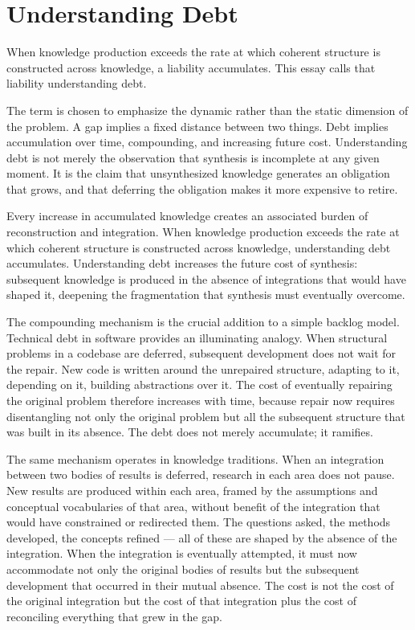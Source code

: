 \section{Understanding Debt}

When knowledge production exceeds the rate at which coherent structure is
constructed across knowledge, a liability accumulates. This essay calls that
liability understanding debt.

The term is chosen to emphasize the dynamic rather than the static dimension
of the problem. A gap implies a fixed distance between two things. Debt implies
accumulation over time, compounding, and increasing future cost. Understanding
debt is not merely the observation that synthesis is incomplete at any given
moment. It is the claim that unsynthesized knowledge generates an obligation
that grows, and that deferring the obligation makes it more expensive to retire.

\begin{principle}
Every increase in accumulated knowledge creates an associated burden of
reconstruction and integration. When knowledge production exceeds the rate
at which coherent structure is constructed across knowledge, understanding
debt accumulates. Understanding debt increases the future cost of synthesis:
subsequent knowledge is produced in the absence of integrations that would
have shaped it, deepening the fragmentation that synthesis must eventually
overcome.
\end{principle}

The compounding mechanism is the crucial addition to a simple backlog model.
Technical debt in software provides an illuminating analogy. When structural
problems in a codebase are deferred, subsequent development does not wait for
the repair. New code is written around the unrepaired structure, adapting to
it, depending on it, building abstractions over it. The cost of eventually
repairing the original problem therefore increases with time, because repair
now requires disentangling not only the original problem but all the subsequent
structure that was built in its absence. The debt does not merely accumulate;
it ramifies.

The same mechanism operates in knowledge traditions. When an integration
between two bodies of results is deferred, research in each area does not
pause. New results are produced within each area, framed by the assumptions
and conceptual vocabularies of that area, without benefit of the integration
that would have constrained or redirected them. The questions asked, the
methods developed, the concepts refined --- all of these are shaped by the
absence of the integration. When the integration is eventually attempted,
it must now accommodate not only the original bodies of results but the
subsequent development that occurred in their mutual absence. The cost is
not the cost of the original integration but the cost of that integration
plus the cost of reconciling everything that grew in the gap.

